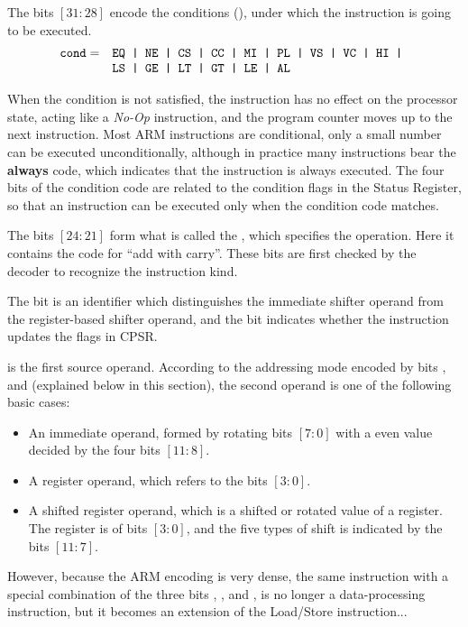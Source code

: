 The bits $[31:28]$ encode the conditions (), under which the instruction is going to be executed.
$$\begin{array}{rl}
   \texttt{cond} = & \texttt{EQ~|~NE~|~CS~|~CC~|~MI~|~PL~|~VS~|~VC~|~HI~|~}\\
                  & \texttt{LS~|~GE~|~LT~|~GT~|~LE~|~AL}
 \end{array}
$$

When the condition is not satisfied, the instruction has no effect on
the processor state, acting like a \textit{No-Op} instruction, and the
program counter moves up to the next instruction.  Most ARM
instructions are conditional, only a small number can be executed
unconditionally, although in practice many instructions bear the
\textbf{always} code, which indicates that the instruction is always
executed.  The four bits of the condition code are related to the
condition flags in the Status Register, so that an instruction can be
executed only when the condition code matches.

The bits $[24:21]$ form what is called the , which
specifies the operation. Here it contains the code for ``add with
carry''.  These bits are first checked by the decoder to recognize the
instruction kind.

The  bit is an identifier which distinguishes the immediate
shifter operand from the register-based shifter operand, and the
 bit indicates whether the instruction updates the flags in
CPSR.

 is the first source operand. According to the addressing
mode encoded by bits , and  (explained below in
this section), the second operand is one of the following basic cases:
\begin{itemize}
\item
An immediate operand, formed by rotating bits $[7:0]$
with a even value decided by the four bits $[11:8]$.
\item
A register operand, which refers to the bits $[3:0]$.
\item
A shifted register operand, which is a shifted or rotated value
  of a register.  The register is of bits $[3:0]$, and the five types
  of shift is indicated by the bits $[11:7]$.
\end{itemize}

However, because the ARM encoding is very dense, the same instruction
with a special combination of the three bits , , and ,
is no longer a data-processing instruction,
but it becomes an extension of the Load/Store instruction...

